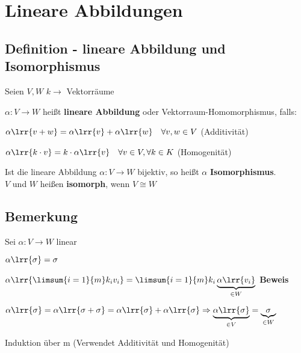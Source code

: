 \newpage
\section{Lineare Abbildungen}

\subsection{Definition - lineare Abbildung und Isomorphismus}
	Seien $V,W$ $k\rightarrow$ Vektorräume
		\item $\alpha:V\rightarrow W$ heißt \textbf{lineare Abbildung} oder Vektorraum-Homomorphismus, falls:
				\item $\alpha\lrr{v+w}=\alpha\lrr{v}+\alpha\lrr{w}\quad\forall v,w\in V$ (Additivität)
				\item $\alpha\lrr{k\cdot v}=k\cdot\alpha\lrr{v}\quad\forall v\in V,\forall k\in K$ (Homogenität)
			\subExEnd
		\item Ist die lineare Abbildung $\alpha: V\rightarrow W$ bijektiv, so heißt $\alpha$ \textbf{Isomorphismus}.\\
			$V$ und $W$ heißen \textbf{isomorph}, wenn $V\cong W$
	\subExEnd

\subsection{Bemerkung}
	Sei $\alpha:V\rightarrow W$ linear
		\item $\alpha\lrr{\sigma}=\sigma$
		\item $\alpha\lrr{\limsum{i=1}{m}k_iv_i}=\limsum{i=1}{m}k_i\underbrace{\alpha\lrr{v_i}}_{\scriptstyle \in W}$
	\subExEnd
	\textbf{Beweis}
		\item $\alpha\lrr{\sigma}=\alpha\lrr{\sigma+\sigma}=\alpha\lrr{\sigma}+\alpha\lrr{\sigma}\Rightarrow\underbrace{\alpha\lrr{\sigma}}_{\scriptstyle \in V}=\underbrace{\sigma}_{\scriptstyle \in W}$
		\item Induktion über m (Verwendet Additivität und Homogenität)
	\subExEnd


